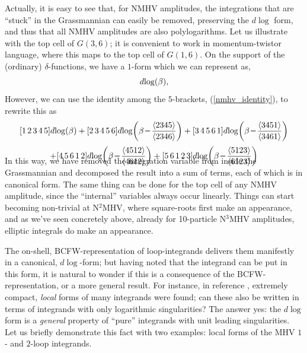 \documentclass[12pt,hyperref,compress]{JHEP3}
\newcommand{\eq}[1]{\begin{equation}#1\end{equation}}
\newcommand{\mi}{{\rm\rule[2.4pt]{6pt}{0.65pt}}}
\newcommand{\pl}{\hspace{0.5pt}\text{{\small+}}\hspace{-0.5pt}}
\newcommand{\ab}[1]{\langle #1 \rangle}
\begin{document}
Actually, it is easy to see that, for NMHV amplitudes, the integrations that are ``stuck'' in the Grassmannian can easily be removed, preserving the $d\!\log$ form, and thus that all NMHV amplitudes are also polylogarithms. Let us illustrate with the top cell of $G(3,6)$; it is convenient to work in momentum-twistor language, where this maps to the top cell of $G(1,6)$. On the support of the (ordinary) $\delta$-functions,
we have a $1$-form which we can represent as,
\vspace{-.2cm}\eq{ [1 \, 2 \, 3 \, 4 \, (5\pl\beta 6)] d\!\log(\beta),\vspace{-.2cm}}
However, we can use the identity among the $5$-brackets, (\ref{nmhv_identity}), to rewrite this as
\vspace{-.2cm}\eq{\begin{array}{c}[1\,2\,3\,4\,5]d\!\log(\beta)+\displaystyle [2\,3\,4\,5\,6]d\!\log\!\left(\beta\,\mi\,\frac{\ab{2345}}{\ab{2346}}\right)+\displaystyle[3\,4\,5\,6\,1]d\!\log\!\left(\beta\,\mi\,\frac{\ab{3451}}{\ab{3461}}\right)\\[12pt]+\displaystyle[4\,5\,6\,1\,2]d\!\log\!\left(\beta\,\mi\,\frac{\ab{4512}}{\ab{4612}}\right)+\displaystyle[5\,6\,1\,2\,3]d\!\log\!\left(\beta\,\mi\,\frac{\ab{5123}}{\ab{6123}}\right)\\[-20pt]\end{array}\vspace{.6cm}}
\noindent In this way, we have removed the integration variable from inside the Grassmannian and decomposed the result into a sum of terms, each of which is in canonical form. The same thing can be done for the top cell of any NMHV amplitude, since the ``internal'' variables always occur linearly. Things can start becoming non-trivial at N$^2$MHV, where square-roots first make an appearance, and as we've seen concretely above, already for 10-particle N$^3$MHV amplitudes, elliptic integrals do make an appearance.

The on-shell, BCFW-representation of loop-integrands delivers them manifestly in a canonical, $d\!\log$-form; but having noted that the integrand can be put in this form, it is natural to wonder if this is a consequence of the BCFW-representation, or a more general result. For instance, in reference \cite{ArkaniHamed:2010gh}, extremely compact, {\it local} forms of many integrands were found; can these also be written in terms of integrands with only logarithmic singularities? The answer yes: the $d\!\log$ form is a {\it general} property of ``pure'' integrands with unit leading singularities.  Let us briefly demonstrate this  fact with two examples: local forms of the MHV $1$- and $2$-loop integrands.
\end{document}
